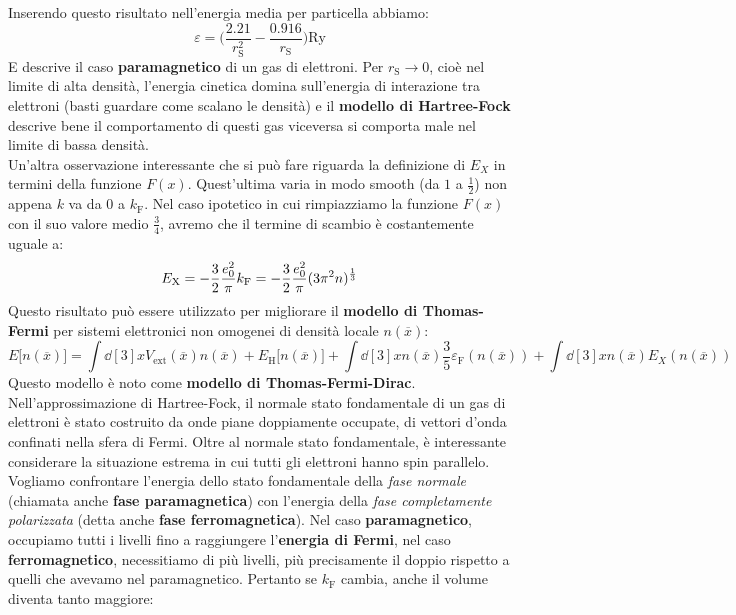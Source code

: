 Inserendo questo risultato nell'energia media per particella abbiamo:
\begin{equation*}
    \varepsilon=\bigg(\frac{2.21}{r_\text{S}^2}-\frac{0.916}{r_\text{S}}\bigg)\text{Ry}
\end{equation*}
E descrive il caso \textbf{paramagnetico} di un gas di elettroni.
Per $r_\text{S}\rightarrow 0$, cioè nel limite di alta densità, l'energia cinetica domina sull'energia di interazione tra elettroni (basti guardare come scalano le densità) e il \textbf{modello di Hartree-Fock} descrive bene il comportamento di questi gas viceversa si comporta male nel limite di bassa densità.\\
Un'altra osservazione interessante che si può fare riguarda la definizione di $E_X$ in termini della funzione $F(x)$. Quest'ultima varia in modo smooth (da $1$ a $\frac 12$) non appena $k$ va da $0$ a $k_\text{F}$. Nel caso ipotetico in cui rimpiazziamo la funzione $F(x)$ con il suo valore medio $\frac 34$, avremo che il termine di scambio è costantemente uguale a:
\begin{equation*}
    E_\text{X}=-\frac32\frac{e_0^2}{\pi}k_{\text F}=-\frac32\frac{e_0^2}{\pi}(3\pi^2n)^{\frac 13}
\end{equation*}
Questo risultato può essere utilizzato per migliorare il \textbf{modello di Thomas-Fermi} per sistemi elettronici non omogenei di densità locale $n(\overline x)$:
\begin{equation*}
    E\big[n(\overline x)\big]=\int \dd[3]{x}V_{\text{ext}}(\overline x)n(\overline x)+E_\text{H}\big[n(\overline x)\big]+\int \dd[3]x n(\overline x)\frac 35\varepsilon_\text{F}(n(\overline x))+\int \dd[3]xn(\overline x)E_X(n(\overline x)) 
\end{equation*}
Questo modello è noto come \textbf{modello di Thomas-Fermi-Dirac}.\newline
Nell'approssimazione di Hartree-Fock, il normale stato fondamentale di un gas di elettroni è stato costruito da onde piane doppiamente occupate, di vettori d'onda confinati nella sfera di Fermi. Oltre al normale stato fondamentale, è interessante considerare la situazione estrema in cui tutti gli elettroni hanno spin parallelo. Vogliamo confrontare l'energia dello stato fondamentale della \textit{fase normale} (chiamata anche \textbf{fase paramagnetica}) con l'energia della \textit{fase completamente polarizzata} (detta anche \textbf{fase ferromagnetica}). Nel caso \textbf{paramagnetico}, occupiamo tutti i livelli fino a raggiungere l'\textbf{energia di Fermi}, nel caso \textbf{ferromagnetico}, necessitiamo di più livelli, più precisamente il doppio rispetto a quelli che avevamo nel paramagnetico. Pertanto se $k_\text{F}$ cambia, anche il volume diventa tanto maggiore:
